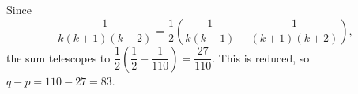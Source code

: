 Since
\[\dfrac{1}{k(k+1)(k+2)}=\dfrac{1}{2}\left(\dfrac{1}{k(k+1)}-\dfrac{1}{(k+1)(k+2)}\right),\]
the sum telescopes to $\dfrac{1}{2}(\dfrac{1}{2}-\dfrac{1}{110})=\dfrac{27}{110}$. This is reduced, so $q-p=110-27=\boxed{83}$.
